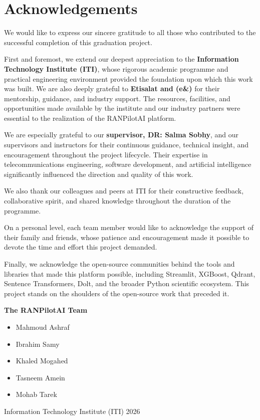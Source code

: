 \chapter*{Acknowledgements}

We would like to express our sincere gratitude to all those who contributed to the successful completion of this graduation project.

First and foremost, we extend our deepest appreciation to the \textbf{Information Technology Institute (ITI)}, whose rigorous academic programme and practical engineering environment provided the foundation upon which this work was built. We are also deeply grateful to \textbf{Etisalat and (e\&)} for their mentorship, guidance, and industry support. The resources, facilities, and opportunities made available by the institute and our industry partners were essential to the realization of the RANPilotAI platform.

We are especially grateful to our \textbf{supervisor, DR: Salma Sobhy}, and our supervisors and instructors for their continuous guidance, technical insight, and encouragement throughout the project lifecycle. Their expertise in telecommunications engineering, software development, and artificial intelligence significantly influenced the direction and quality of this work.

We also thank our colleagues and peers at ITI for their constructive feedback, collaborative spirit, and shared knowledge throughout the duration of the programme.

On a personal level, each team member would like to acknowledge the support of their family and friends, whose patience and encouragement made it possible to devote the time and effort this project demanded.

Finally, we acknowledge the open-source communities behind the tools and libraries that made this platform possible, including Streamlit, XGBoost, Qdrant, Sentence Transformers, Dolt, and the broader Python scientific ecosystem. This project stands on the shoulders of the open-source work that preceded it.

\vspace{1cm}

\noindent\textbf{The RANPilotAI Team}

\begin{itemize}
    \item Mahmoud Ashraf
    \item Ibrahim Samy
    \item Khaled Mogahed
    \item Tasneem Amein
    \item Mohab Tarek
\end{itemize}

\vspace{0.5cm}

\noindent Information Technology Institute (ITI) \hfill 2026

\clearpage
